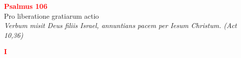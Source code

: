 


\def\greinitialformat#1{%
{\fontsize{39}{39}\selectfont #1}%
}




\vspace{0.3cm}
\begin{center}
 \textcolor{red}{\large \bf Psalmus 106}\\
Pro liberatione gratiarum actio\\
\textit{\small Verbum misit Deus filiis Israel, annuntians pacem per Iesum Christum. (Act 10,36)}
\end{center}
\begin{center}
\textcolor{red}{\bf I}
\end{center}
